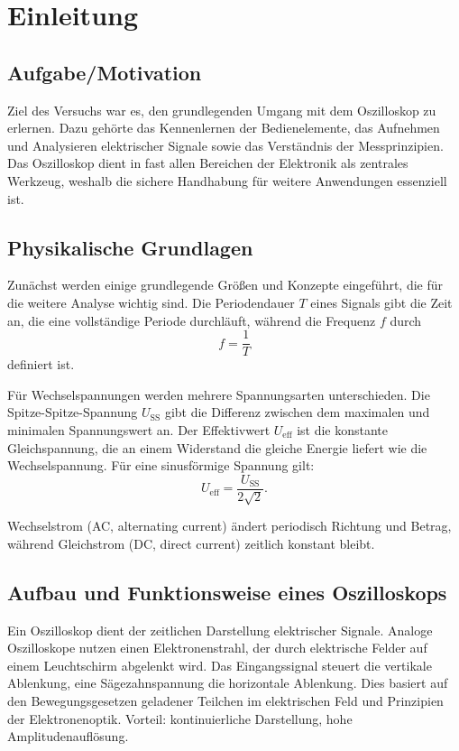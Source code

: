 \chapter{Einleitung}

\section{Aufgabe/Motivation}
Ziel des Versuchs war es, den grundlegenden Umgang mit dem Oszilloskop zu erlernen. Dazu gehörte das Kennenlernen der Bedienelemente, das Aufnehmen und Analysieren elektrischer Signale sowie das Verständnis der Messprinzipien. Das Oszilloskop dient in fast allen Bereichen der Elektronik als zentrales Werkzeug, weshalb die sichere Handhabung für weitere Anwendungen essenziell ist.

\section{Physikalische Grundlagen}
\cite{skript25}
Zunächst werden einige grundlegende Größen und Konzepte eingeführt, die für die weitere Analyse wichtig sind. Die Periodendauer $T$ eines Signals gibt die Zeit an, die eine vollständige Periode durchläuft, während die Frequenz $f$ durch
\begin{equation}
f = \frac{1}{T}
\end{equation}
definiert ist.  

Für Wechselspannungen werden mehrere Spannungsarten unterschieden. Die Spitze-Spitze-Spannung $U_\text{SS}$ gibt die Differenz zwischen dem maximalen und minimalen Spannungswert an. Der Effektivwert $U_\text{eff}$ ist die konstante Gleichspannung, die an einem Widerstand die gleiche Energie liefert wie die Wechselspannung. Für eine sinusförmige Spannung gilt:
\begin{equation}
U_\text{eff} = \frac{U_\text{SS}}{2\sqrt{2}}.
\end{equation}

Wechselstrom (AC, alternating current) ändert periodisch Richtung und Betrag, während Gleichstrom (DC, direct current) zeitlich konstant bleibt.  

\section{Aufbau und Funktionsweise eines Oszilloskops}
Ein Oszilloskop dient der zeitlichen Darstellung elektrischer Signale. Analoge Oszilloskope nutzen einen Elektronenstrahl, der durch elektrische Felder auf einem Leuchtschirm abgelenkt wird. Das Eingangssignal steuert die vertikale Ablenkung, eine Sägezahnspannung die horizontale Ablenkung. Dies basiert auf den Bewegungsgesetzen geladener Teilchen im elektrischen Feld und Prinzipien der Elektronenoptik. Vorteil: kontinuierliche Darstellung, hohe Amplitudenauflösung.

